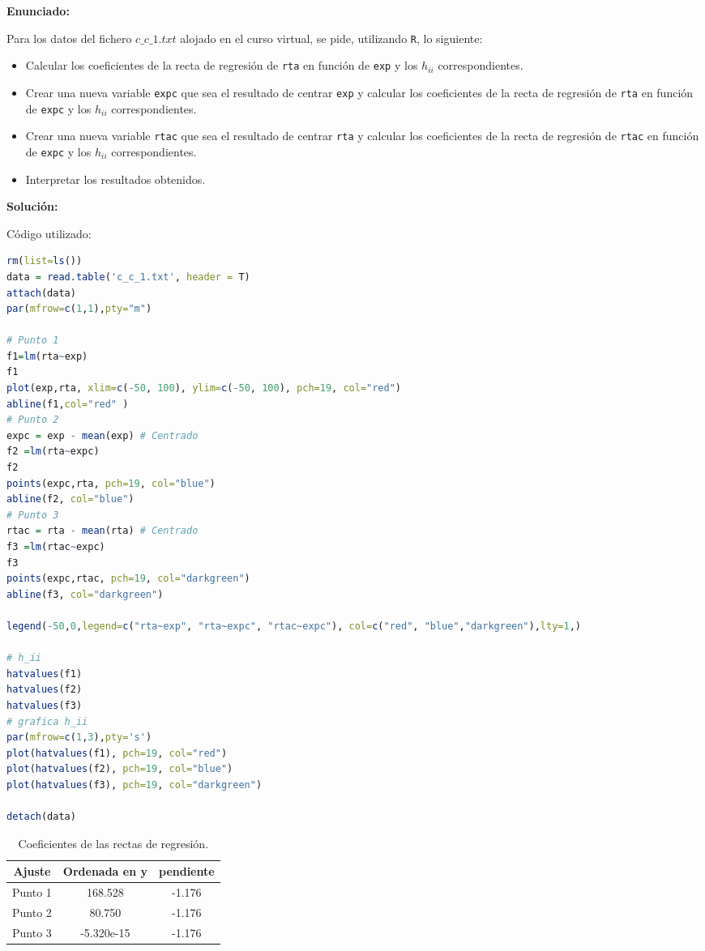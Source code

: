 \documentclass[a4paper]{article}
\begin{document}
\textbf{Enunciado:}\par
Para los datos del fichero $c\_c\_1.txt$ alojado en el curso virtual, se pide, utilizando \verb|R|, lo siguiente:
\begin{itemize}
    \item Calcular los coeficientes de la recta de regresión de \verb|rta| en función de \verb|exp| y los $h_{ii}$ correspondientes.
    \item Crear una nueva variable \verb|expc| que sea el resultado de centrar \verb|exp| y calcular los coeficientes de la recta de regresión de \verb|rta| en función de \verb|expc| y los $h_{ii}$ correspondientes.
    \item Crear una nueva variable \verb|rtac| que sea el resultado de centrar \verb|rta| y calcular los coeficientes de la recta de regresión de \verb|rtac| en función de \verb|expc| y los $h_{ii}$ correspondientes.
    \item Interpretar los resultados obtenidos.
\end{itemize}
\textbf{Solución:}\par
Código utilizado:\par
\begin{lstlisting}[language=R]
rm(list=ls())
data = read.table('c_c_1.txt', header = T)
attach(data)
par(mfrow=c(1,1),pty="m")

# Punto 1
f1=lm(rta~exp)
f1
plot(exp,rta, xlim=c(-50, 100), ylim=c(-50, 100), pch=19, col="red")
abline(f1,col="red" )
# Punto 2
expc = exp - mean(exp) # Centrado
f2 =lm(rta~expc)
f2
points(expc,rta, pch=19, col="blue")
abline(f2, col="blue")
# Punto 3
rtac = rta - mean(rta) # Centrado
f3 =lm(rtac~expc)
f3
points(expc,rtac, pch=19, col="darkgreen")
abline(f3, col="darkgreen")

legend(-50,0,legend=c("rta~exp", "rta~expc", "rtac~expc"), col=c("red", "blue","darkgreen"),lty=1,)

# h_ii
hatvalues(f1)
hatvalues(f2)
hatvalues(f3)
# grafica h_ii
par(mfrow=c(1,3),pty='s')
plot(hatvalues(f1), pch=19, col="red")
plot(hatvalues(f2), pch=19, col="blue")
plot(hatvalues(f3), pch=19, col="darkgreen")

detach(data)
\end{lstlisting}
\begin{table}
    \centering
    \begin{tabular}{ c  c  c }
    Ajuste & Ordenada en y &  pendiente \\ \hline
    Punto 1 & 168.528   &    -1.176 \\
    Punto 2 & 80.750   &   -1.176 \\
    Punto 3 & -5.320e-15 & -1.176 \\
    \end{tabular}
    \caption{\label{tab:41}Coeficientes de las rectas de regresión.}
\end{table}
\end{document}

